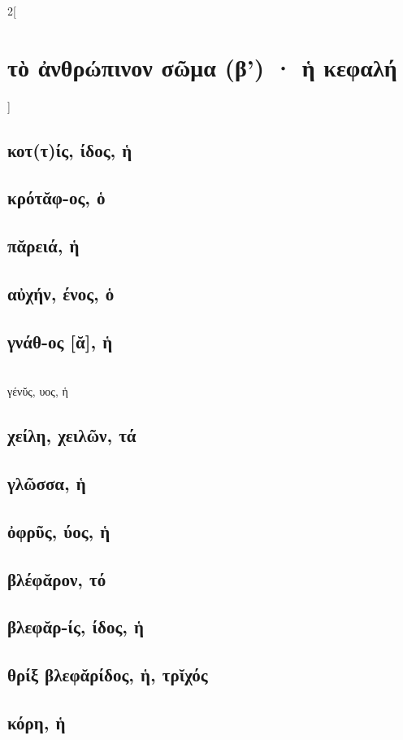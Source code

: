 \documentclass{book}
\begin{document}
\begin{multicols}{2}[\section{τὸ ἀνθρώπινον σῶμα (β') · ἡ κεφαλή}]
\subsection{κοτ(τ)ίς, ίδος, ἡ} 
\subsection{κρότᾰφ-ος, ὁ}        
\subsection{πᾰρειά, ἡ}
\subsection{αὐχήν, ένος, ὁ}
\subsection{γνάθ-ος [ᾰ], ἡ}  ~\\
γένῠς, υος, ἡ 
\subsection{χείλη, χειλῶν, τά}
\subsection{γλῶσσα, ἡ}
\subsection{ὀφρῦς, ύος, ἡ}
\subsection{βλέφᾰρον, τό}
\subsection{βλεφᾰρ-ίς, ίδος, ἡ}
\subsection{θρίξ βλεφᾰρίδος, ἡ, τρῐχός}
\subsection{κόρη, ἡ}

\end{multicols}
\end{document}
